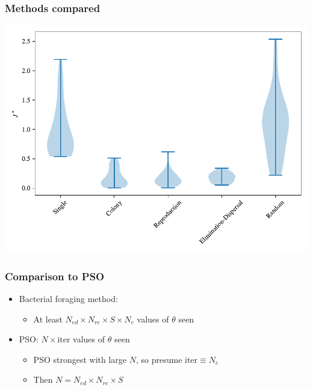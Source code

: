 \documentclass{beamer}
\begin{document}
\begin{frame}
\frametitle{Methods compared}
\begin{center}
\includegraphics[scale=0.5]{assets/compared}
\end{center}
\end{frame}

\begin{frame}
\frametitle{Comparison to PSO}
\begin{itemize}
  \item Bacterial foraging method:
  \begin{itemize}
    \item   At least $N_{ed} \times N_{re} \times S \times N_c$ values of $\theta$ seen
  \end{itemize}
  \item PSO: $N \times \text{iter}$ values of $\theta$ seen
  \begin{itemize}
    \item PSO strongest with large $N$, so presume $\text{iter} \equiv N_c$
    \item Then $N = N_{ed} \times N_{re} \times S$
  \end{itemize}
\end{itemize}
\end{frame}
\end{document}
